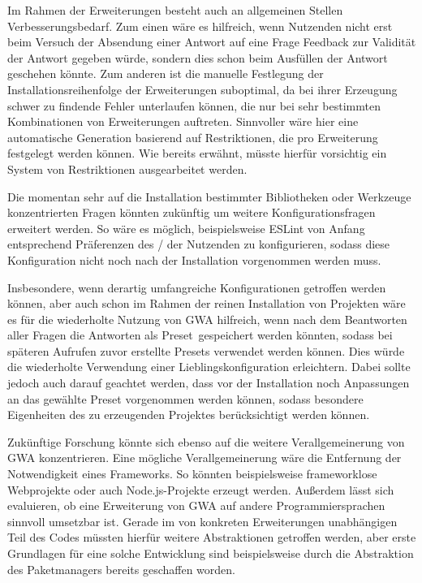Im Rahmen der Erweiterungen besteht auch an allgemeinen Stellen Verbesserungsbedarf. Zum einen wäre es hilfreich, wenn Nutzenden nicht erst beim Versuch der Absendung einer Antwort auf eine Frage Feedback zur Validität der Antwort gegeben würde, sondern dies schon beim Ausfüllen der Antwort geschehen könnte. Zum anderen ist die manuelle Festlegung der Installationsreihenfolge der Erweiterungen suboptimal, da bei ihrer Erzeugung schwer zu findende Fehler unterlaufen können, die nur bei sehr bestimmten Kombinationen von Erweiterungen auftreten. Sinnvoller wäre hier eine automatische Generation basierend auf Restriktionen, die pro Erweiterung festgelegt werden können. Wie bereits erwähnt, müsste hierfür vorsichtig ein System von Restriktionen ausgearbeitet werden.

Die momentan sehr auf die Installation bestimmter Bibliotheken oder Werkzeuge konzentrierten Fragen könnten zukünftig um weitere Konfigurationsfragen erweitert werden. So wäre es möglich, beispielsweise ESLint von Anfang entsprechend Präferenzen des / der Nutzenden zu konfigurieren, sodass diese Konfiguration nicht noch nach der Installation vorgenommen werden muss.

Insbesondere, wenn derartig umfangreiche Konfigurationen getroffen werden können, aber auch schon im Rahmen der reinen Installation von Projekten wäre es für die wiederholte Nutzung von \gls{GWA} hilfreich, wenn nach dem Beantworten aller Fragen die Antworten als \glqq Preset\grqq\ gespeichert werden könnten, sodass bei späteren Aufrufen zuvor erstellte Presets verwendet werden können. Dies würde die wiederholte Verwendung einer Lieblingskonfiguration erleichtern. Dabei sollte jedoch auch darauf geachtet werden, dass vor der Installation noch Anpassungen an das gewählte Preset vorgenommen werden können, sodass besondere Eigenheiten des zu erzeugenden Projektes berücksichtigt werden können.

Zukünftige Forschung könnte sich ebenso auf die weitere Verallgemeinerung von \gls{GWA} konzentrieren. Eine mögliche Verallgemeinerung wäre die Entfernung der Notwendigkeit eines Frameworks. So könnten beispielsweise frameworklose Webprojekte oder auch Node.js-Projekte erzeugt werden. Außerdem lässt sich evaluieren, ob eine Erweiterung von \gls{GWA} auf andere Programmiersprachen sinnvoll umsetzbar ist. Gerade im von konkreten Erweiterungen unabhängigen Teil des Codes müssten hierfür weitere Abstraktionen getroffen werden, aber erste Grundlagen für eine solche Entwicklung sind beispielsweise durch die Abstraktion des Paketmanagers bereits geschaffen worden.